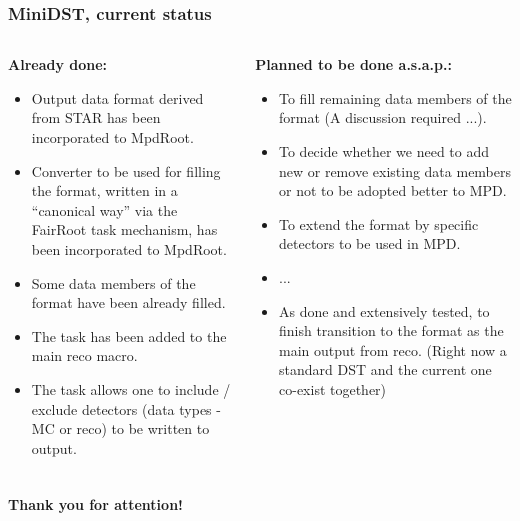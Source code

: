 \documentclass[dvipsnames] {beamer}
\begin{document}
\begin{frame}
  \bf
  \footnotesize
  \frametitle{\bf \centering MiniDST, current status}
  \begin{columns}
    \begin{block}{\bf \centering \color{darkred!70!black} Already done:}
      \begin{itemize}
      \item Output data format derived from STAR has been incorporated to MpdRoot.
      \item Converter to be used for filling the format, written in a ``canonical way''
        via the FairRoot task mechanism, has been incorporated to MpdRoot.
      \item Some data members of the format have been already filled.
      \item The task has been added to the main reco macro.
      \item The task allows one to include / exclude detectors (data types - MC or reco) to be written to output.  
      \end{itemize}     
    \end{block}
  
    \begin{block}{\bf \centering \color{darkblue!70!black} Planned to be done a.s.a.p.:}
      \begin{itemize}
      \item To fill remaining data members of the format (A discussion required ...).
      \item To decide whether we need to add new or remove existing data members or not to be adopted better to MPD.
      \item To extend the format by specific detectors to be used in MPD.
      \item ...
      \item {\color{darkred!70!black} As done and extensively tested, to finish transition to the format as the main output from reco.}
        (Right now a standard DST and the current one co-exist together)
      \end{itemize} 
    \end{block}    
  \end{columns} 
\end{frame}
      
      \begin{frame}
        \frametitle{}
        \begin{center}
          \bf
          \Huge {Thank you for attention!}
        \end{center}
      \end{frame}
      
      
\end{document}

